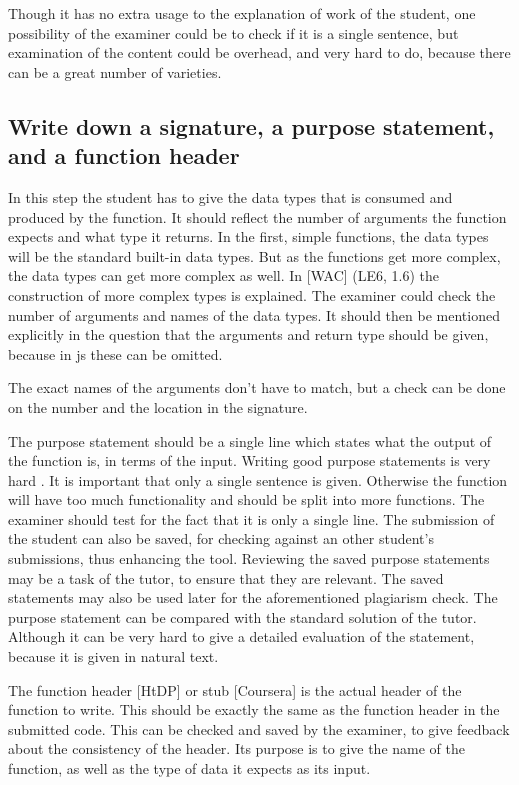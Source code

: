  Though it has no extra usage to the explanation of work of the \gls{student},
one possibility of the \gls{examiner} could be to check if it is a single sentence,
but examination of the content could be overhead, and very hard to do, because
there can be a great number of varieties.



\subsection{Write down a signature, a purpose statement, and a function header}
In this step the \gls{student} has to give the data types that is consumed and produced
by the function.
It should reflect the number of arguments the function expects and what type it
returns.
In the first, simple functions, the data types will be the standard built-in
data types. But as the functions get more complex, the data types can get more
complex as well.
In [WAC] (LE6, 1.6) the construction of more complex types is explained.
The \gls{examiner} could check the number of arguments and names of the
data types. 
It should then be mentioned explicitly in the question that the arguments and 
return type should be given, because in \gls{js} these can be omitted.

The exact names of the arguments don't have to match, but a check can be done on
the number and the location in the signature. 


The purpose statement should be a single line which states what the output of the
function is, in terms of the input.
Writing good purpose statements is very hard \citep{ramsey_teaching_2015}.
It is important that only a single sentence is given. Otherwise the function will
have too much functionality and should be split into more functions.
The \gls{examiner} should test for the fact that it is only a single line.
The submission of the \gls{student} can also be saved, for checking against an
other \gls{student}'s submissions, thus enhancing the tool. Reviewing the saved
purpose statements may be a task of the tutor, to ensure that they are relevant.
The saved statements may also be used later for the aforementioned plagiarism check.
The purpose statement can be compared with the standard \gls{solution} of the
\gls{tutor}. Although it can be very hard to give a detailed evaluation of the
statement, because it is given in natural text.

The function header [HtDP] or stub [Coursera] is the actual header of the
function to write. This should be exactly the same as the function header in the
submitted \gls{code}.
This can be checked and saved by the \gls{examiner}, to give feedback about
the consistency of the header.
Its purpose is to give the name of the function, as well as the type of data it
expects as its input.

